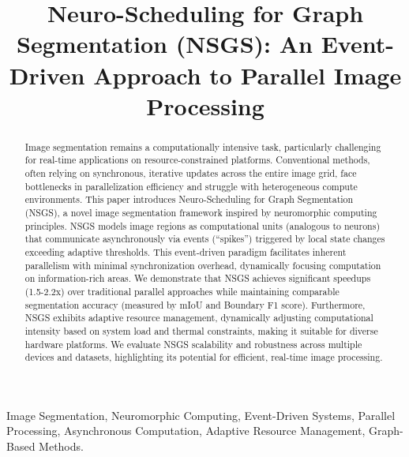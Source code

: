 \documentclass[conference]{IEEEtran}
\begin{document}
\title{Neuro-Scheduling for Graph Segmentation (NSGS): An Event-Driven Approach to Parallel Image Processing}

\author{
\and
{}
}

\maketitle

\begin{abstract}
Image segmentation remains a computationally intensive task, particularly challenging for real-time applications on resource-constrained platforms. Conventional methods, often relying on synchronous, iterative updates across the entire image grid, face bottlenecks in parallelization efficiency and struggle with heterogeneous compute environments. This paper introduces Neuro-Scheduling for Graph Segmentation (NSGS), a novel image segmentation framework inspired by neuromorphic computing principles. NSGS models image regions as computational units (analogous to neurons) that communicate asynchronously via events (``spikes'') triggered by local state changes exceeding adaptive thresholds. This event-driven paradigm facilitates inherent parallelism with minimal synchronization overhead, dynamically focusing computation on information-rich areas. We demonstrate that NSGS achieves significant speedups (1.5-2.2x) over traditional parallel approaches while maintaining comparable segmentation accuracy (measured by mIoU and Boundary F1 score). Furthermore, NSGS exhibits adaptive resource management, dynamically adjusting computational intensity based on system load and thermal constraints, making it suitable for diverse hardware platforms. We evaluate NSGS scalability and robustness across multiple devices and datasets, highlighting its potential for efficient, real-time image processing.
\end{abstract}

\begin{IEEEkeywords}
Image Segmentation, Neuromorphic Computing, Event-Driven Systems, Parallel Processing, Asynchronous Computation, Adaptive Resource Management, Graph-Based Methods.
\end{IEEEkeywords}
\end{document}
